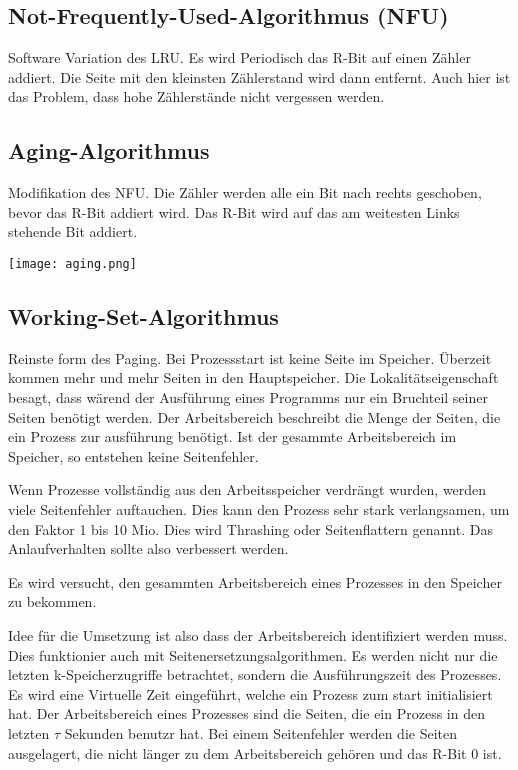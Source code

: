 \subsection{Not-Frequently-Used-Algorithmus (NFU)}

Software Variation des LRU. Es wird Periodisch das R-Bit auf einen Zähler
addiert. Die Seite mit den kleinsten Zählerstand wird dann entfernt. Auch hier
ist das Problem, dass hohe Zählerstände nicht vergessen werden.

\subsection{Aging-Algorithmus}

Modifikation des NFU. Die Zähler werden alle ein Bit nach rechts geschoben,
bevor das R-Bit addiert wird. Das R-Bit wird auf das am weitesten Links
stehende Bit addiert.

\texttt{[image: aging.png]}

\subsection{Working-Set-Algorithmus}

Reinste form des Paging. Bei Prozessstart ist keine Seite im Speicher. Überzeit
kommen mehr und mehr Seiten in den Hauptspeicher. Die Lokalitätseigenschaft
besagt, dass wärend der Ausführung eines Programms nur ein Bruchteil seiner
Seiten benötigt werden. Der Arbeitsbereich beschreibt die Menge der Seiten, die
ein Prozess zur ausführung benötigt. Ist der gesammte Arbeitsbereich im
Speicher, so entstehen keine Seitenfehler.

Wenn Prozesse vollständig aus den Arbeitsspeicher verdrängt wurden, werden
viele Seitenfehler auftauchen. Dies kann den Prozess sehr stark verlangsamen,
um den Faktor 1 bis 10 Mio. Dies wird Thrashing oder Seitenflattern genannt.
Das Anlaufverhalten sollte also verbessert werden.

Es wird versucht, den gesammten Arbeitsbereich eines Prozesses in den Speicher
zu bekommen.

Idee für die Umsetzung ist also dass der Arbeitsbereich identifiziert werden
muss. Dies funktionier auch mit Seitenersetzungsalgorithmen. Es werden nicht
nur die letzten k-Speicherzugriffe betrachtet, sondern die Ausführungszeit des
Prozesses. Es wird eine Virtuelle Zeit eingeführt, welche ein Prozess zum start
initialisiert hat. Der Arbeitsbereich eines Prozesses sind die Seiten, die ein
Prozess in den letzten $\tau$ Sekunden benutzr hat. Bei einem Seitenfehler
werden die Seiten ausgelagert, die nicht länger zu dem Arbeitsbereich gehören
und das R-Bit 0 ist.

